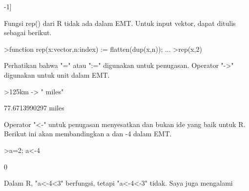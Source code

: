 \documentclass[a4paper,10pt]{article}
\begin{document}
\begin{eulernotebook}
\begin{eulercomment}
\begin{eulercomment}
\begin{eulercomment}
\begin{eulercomment}
\begin{eulercomment}
\begin{eulercomment}
\begin{eulercomment}
\begin{eulercomment}
\begin{eulercomment}
\begin{eulercomment}
\begin{eulercomment}
\begin{eulercomment}
\begin{eulercomment}
\begin{eulercomment}
\begin{eulercomment}
\begin{eulercomment}
\begin{eulercomment}
\begin{eulercomment}
\begin{eulercomment}
\begin{eulercomment}
\begin{eulercomment}
\begin{eulercomment}
\begin{eulercomment}
\begin{eulercomment}
\begin{eulercomment}
\begin{eulercomment}
\begin{eulercomment}
\begin{eulercomment}
\begin{eulercomment}
\begin{eulercomment}
\begin{eulercomment}
\begin{eulercomment}
\begin{eulercomment}
\begin{eulercomment}
\begin{eulercomment}
\begin{eulercomment}
\begin{eulercomment}
\begin{eulercomment}
\begin{eulercomment}
\begin{eulercomment}
\begin{eulercomment}
\begin{eulercomment}
\begin{eulercomment}
\begin{eulercomment}
\begin{eulercomment}
\begin{eulercomment}
\begin{eulercomment}
\begin{eulercomment}
\begin{eulercomment}
\begin{eulercomment}
\begin{eulercomment}
\begin{eulercomment}
\begin{eulercomment}
\begin{eulercomment}
\begin{eulercomment}
\begin{eulercomment}
\begin{eulercomment}
\begin{eulercomment}
\begin{eulercomment}
\begin{eulercomment}
\begin{eulercomment}
\begin{eulercomment}
\begin{eulercomment}
\begin{eulercomment}
\begin{eulercomment}
\begin{eulercomment}
\begin{eulercomment}
\begin{eulercomment}
\begin{euleroutput}
-1]
\end{euleroutput}
\begin{eulercomment}
Fungsi rep() dari R tidak ada dalam EMT. Untuk input vektor, dapat
ditulis sebagai berikut.
\end{eulercomment}
\begin{eulerprompt}
>function rep(x:vector,n:index) := flatten(dup(x,n)); ...
>rep(x,2)
\end{eulerprompt}
\begin{euleroutput}
  [10.4,  5.6,  3.1,  6.4,  21.7,  10.4,  5.6,  3.1,  6.4,  21.7]
\end{euleroutput}
\begin{eulercomment}
Perhatikan bahwa "=" atau ":=" digunakan untuk penugasan. Operator
"-\textgreater{}" digunakan untuk unit dalam EMT.
\end{eulercomment}
\begin{eulerprompt}
>125km -> " miles"
\end{eulerprompt}
\begin{euleroutput}
  77.6713990297 miles
\end{euleroutput}
\begin{eulercomment}
Operator "\textless{}-" untuk penugasan menyesatkan dan bukan ide yang baik
untuk R. Berikut ini akan membandingkan a dan -4 dalam EMT.
\end{eulercomment}
\begin{eulerprompt}
>a=2; a<-4
\end{eulerprompt}
\begin{euleroutput}
  0
\end{euleroutput}
\begin{eulercomment}
Dalam R, "a\textless{}-4\textless{}3" berfungsi, tetapi "a\textless{}-4\textless{}-3" tidak. Saya juga
mengalami 
\end{eulercomment}
\end{eulercomment}
\end{eulercomment}
\end{eulercomment}
\end{eulercomment}
\end{eulercomment}
\end{eulercomment}
\end{eulercomment}
\end{eulercomment}
\end{eulercomment}
\end{eulercomment}
\end{eulercomment}
\end{eulercomment}
\end{eulercomment}
\end{eulercomment}
\end{eulercomment}
\end{eulercomment}
\end{eulercomment}
\end{eulercomment}
\end{eulercomment}
\end{eulercomment}
\end{eulercomment}
\end{eulercomment}
\end{eulercomment}
\end{eulercomment}
\end{eulercomment}
\end{eulercomment}
\end{eulercomment}
\end{eulercomment}
\end{eulercomment}
\end{eulercomment}
\end{eulercomment}
\end{eulercomment}
\end{eulercomment}
\end{eulercomment}
\end{eulercomment}
\end{eulercomment}
\end{eulercomment}
\end{eulercomment}
\end{eulercomment}
\end{eulercomment}
\end{eulercomment}
\end{eulercomment}
\end{eulercomment}
\end{eulercomment}
\end{eulercomment}
\end{eulercomment}
\end{eulercomment}
\end{eulercomment}
\end{eulercomment}
\end{eulercomment}
\end{eulercomment}
\end{eulercomment}
\end{eulercomment}
\end{eulercomment}
\end{eulercomment}
\end{eulercomment}
\end{eulercomment}
\end{eulercomment}
\end{eulercomment}
\end{eulercomment}
\end{eulercomment}
\end{eulercomment}
\end{eulercomment}
\end{eulercomment}
\end{eulercomment}
\end{eulercomment}
\end{eulercomment}
\end{eulercomment}
\end{eulernotebook}
\end{document}
